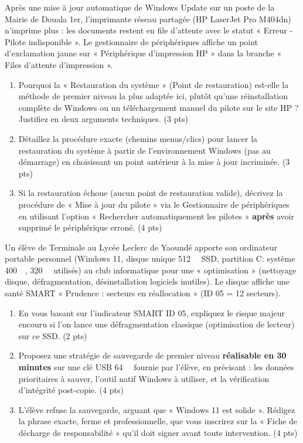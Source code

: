 \documentclass[11pt]{article}
\begin{document}
\begin{exercice}
Après une mise à jour automatique de Windows Update sur un poste de la Mairie de Douala 1er, l'imprimante réseau partagée (HP LaserJet Pro M404dn) n'imprime plus : les documents restent en file d'attente avec le statut « Erreur - Pilote indisponible ». Le gestionnaire de périphériques affiche un point d'exclamation jaune sur « Périphérique d'impression HP » dans la branche « Files d'attente d'impression ».

\begin{enumerate}
    \item Pourquoi la « Restauration du système » (Point de restauration) est-elle la méthode de premier niveau la plus adaptée ici, plutôt qu'une réinstallation complète de Windows ou un téléchargement manuel du pilote sur le site HP ? Justifiez en deux arguments techniques. (3 pts)
    \item Détaillez la procédure exacte (chemins menus/clics) pour lancer la restauration du système à partir de l'environnement Windows (pas au démarrage) en choisissant un point antérieur à la mise à jour incriminée. (3 pts)
    \item Si la restauration échoue (aucun point de restauration valide), décrivez la procédure de « Mise à jour du pilote » via le Gestionnaire de périphériques en utilisant l'option « Rechercher automatiquement les pilotes » \textbf{après} avoir supprimé le périphérique erroné. (4 pts)
\end{enumerate}
\end{exercice}

\begin{exercice}
Un élève de Terminale au Lycée Leclerc de Yaoundé apporte son ordinateur portable personnel (Windows 11, disque unique \SI{512}{\giga\byte} SSD, partition C: système \SI{400}{\giga\byte}, \SI{320}{\giga\byte} utilisés) au club informatique pour une « optimisation » (nettoyage disque, défragmentation, désinstallation logiciels inutiles). Le disque affiche une santé SMART « Prudence : secteurs en réallocation » (ID 05 = 12 secteurs).

\begin{enumerate}
    \item En vous basant sur l'indicateur SMART ID 05, expliquez le risque majeur encouru si l'on lance une défragmentation classique (optimisation de lecteur) sur ce SSD. (2 pts)
    \item Proposez une stratégie de sauvegarde de premier niveau \textbf{réalisable en 30 minutes} sur une clé USB \SI{64}{\giga\byte} fournie par l'élève, en précisant : les données prioritaires à sauver, l'outil natif Windows à utiliser, et la vérification d'intégrité post-copie. (4 pts)
    \item L'élève refuse la sauvegarde, arguant que « Windows 11 est solide ». Rédigez la phrase exacte, ferme et professionnelle, que vous inscrirez sur la « Fiche de décharge de responsabilité » qu'il doit signer avant toute intervention. (4 pts)
\end{enumerate}
\end{exercice}
\end{document}
